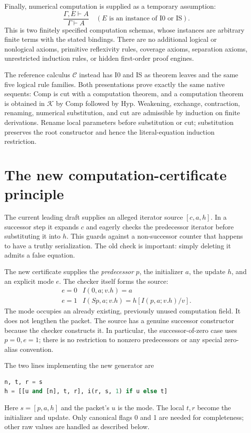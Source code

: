 \documentclass[11pt,letterpaper]{article}
\theoremstyle{definition}\newtheorem{definition}[theorem]{Definition}
\theoremstyle{remark}\newtheorem{remark}[theorem]{Remark}
\newcommand{\Kcal}{\mathcal K}
\newcommand{\Ccal}{\mathcal C}
\begin{document}
Finally, numerical computation is supplied as a temporary assumption:
\[
 \frac{\Gamma,E\vdash A}{\Gamma\vdash A}
 \quad\left(E\text{ is an instance of I0 or IS}\right).
 \tag{Comp}
\]
This is two finitely specified computation schemas, whose instances are
arbitrary finite terms with the stated bindings. There are no additional
logical or nonlogical axioms, primitive reflexivity rules, coverage
axioms, separation axioms, unrestricted induction rules, or hidden
first-order proof engines.

The reference calculus $\Ccal$ instead has I0 and IS as theorem leaves
and the same five logical rule families. Both presentations prove exactly
the same native sequents: Comp is cut with a computation theorem, and a
computation theorem is obtained in $\Kcal$ by Comp followed by Hyp.
Weakening, exchange, contraction, renaming, numerical substitution, and
cut are admissible by induction on finite derivations. Rename local
parameters before substitution or cut; substitution preserves the root
constructor and hence the literal-equation induction restriction.

\section{The new computation-certificate principle}
\label{sec:principle}

The current leading draft supplies an alleged iterator source
$[c,a,h]$. In a successor step it expands $c$ and eagerly checks the
predecessor iterator before substituting it into $h$. This guards against
a non-successor counter that happens to have a truthy serialization.
The old check is important: simply deleting it admits a false equation.

The new certificate supplies the \emph{predecessor} $p$, the initializer
$a$, the update $h$, and an explicit mode $e$. The checker itself forms
the source:
\[
\begin{array}{c|c}
e=0 & I(0,a;v.h)=a\\[2pt]
e=1 & I(Sp,a;v.h)=h[I(p,a;v.h)/v].
\end{array}
\]
The mode occupies an already existing, previously unused computation
field. It does not lengthen the packet. The source has a genuine
successor constructor because the checker constructs it. In particular,
the successor-of-zero case uses $p=0,e=1$; there is no restriction to
nonzero predecessors or any special zero-alias convention.

The two lines implementing the new generator are
\begin{lstlisting}[language=Python]
n, t, r = s
h = [[u and [n], t, r], i(r, s, 1) if u else t]
\end{lstlisting}
Here $s=[p,a,h]$ and the packet's $u$ is the mode. The local $t,r$
become the initializer and update. Only canonical flags 0 and 1 are
needed for completeness; other raw values are handled as described below.
\end{document}
